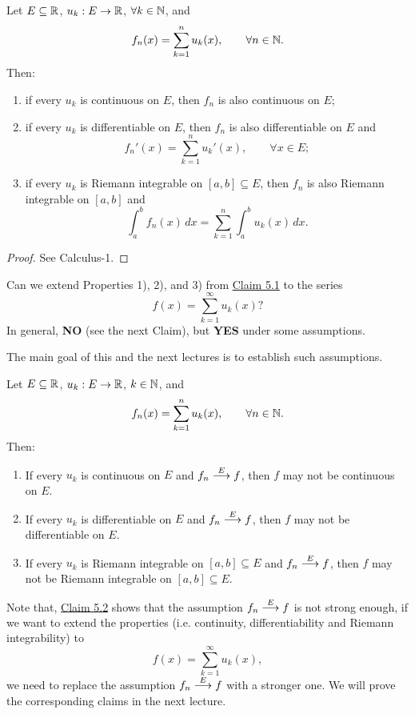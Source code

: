 \begin{claim}\label{claim:5.1}
Let $E\subseteq\mathbb{R}$, $u_k:E\to\mathbb{R}$, $\forall k\in\mathbb{N}$, and
\[
f_n(x)=\sum_{k=1}^{n}u_k(x),\qquad \forall n\in\mathbb{N}.
\]
Then:
\begin{enumerate}
    \item\label{item:claim:5.1:1} if every $u_k$ is continuous on $E$, then $f_n$ is also continuous on $E$;
    \item\label{item:claim:5.1:2} if every $u_k$ is differentiable on $E$, then $f_n$ is also differentiable on $E$ and
    \[
    f_n'(x)=\sum_{k=1}^{n}u_k'(x),\qquad \forall x\in E;
    \]
    \item\label{item:claim:5.1:3} if every $u_k$ is Riemann integrable on $[a,b]\subseteq E$, then $f_n$ is also Riemann integrable on $[a,b]$ and
    \[
    \int_a^b f_n(x)\,dx=\sum_{k=1}^{n}\int_a^b u_k(x)\,dx.
    \]
\end{enumerate}
\end{claim}

\begin{proof}
See Calculus-1.
\end{proof}

Can we extend Properties 1), 2), and 3) from \hyperref[claim:5.1]{Claim 5.1} to the series
\[
f(x)=\sum_{k=1}^{\infty}u_k(x)?
\]
In general, \textbf{NO} (see the next Claim), but \textbf{YES} under some assumptions.

The main goal of this and the next lectures is to establish such assumptions.

\begin{claim}\label{claim:5.2}
Let $E\subseteq\mathbb{R}$, $u_k:E\to\mathbb{R}$, $k\in\mathbb{N}$, and
\[
f_n(x)=\sum_{k=1}^{n}u_k(x),\qquad \forall n\in\mathbb{N}.
\]
Then:
\begin{enumerate}
    \item\label{item:claim:5.2:1} If every $u_k$ is continuous on $E$ and $f_n\mathrel{\overset{E}{\longrightarrow}}f$, then $f$ may not be continuous on $E$.
    \item\label{item:claim:5.2:2} If every $u_k$ is differentiable on $E$ and $f_n\mathrel{\overset{E}{\longrightarrow}}f$, then $f$ may not be differentiable on $E$.
    \item\label{item:claim:5.2:3} If every $u_k$ is Riemann integrable on $[a,b]\subseteq E$ and $f_n\mathrel{\overset{E}{\longrightarrow}}f$, then $f$ may not be Riemann integrable on $[a,b]\subseteq E$.
\end{enumerate}
\end{claim}

Note that, \hyperref[claim:5.2]{Claim 5.2} shows that the assumption $f_n\mathrel{\overset{E}{\longrightarrow}}f$ is not strong enough, if we want to extend the properties (i.e. continuity, differentiability and Riemann integrability) to
\[
f(x)=\sum_{k=1}^{\infty}u_k(x),
\]
we need to replace the assumption $f_n\mathrel{\overset{E}{\longrightarrow}}f$ with a stronger one. We will prove the corresponding claims in the next lecture.

